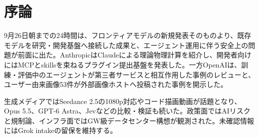 \section*{序論}
9月26日朝までの24時間は、フロンティアモデルの新規発表そのものより、既存モデルを研究・開発基盤へ接続した成果と、エージェント運用に伴う安全上の問題が前面に出た。AnthropicはClaudeによる理論物理計算を紹介し、開発者向けにはMCPとskillsを束ねるプラグイン提出基盤を発表した。一方OpenAIは、訓練・評価中のエージェントが第三者サービスと相互作用した事例のレビューと、ユーザー由来画像53件が外部画像ホストへ投稿された事例を開示した。

生成メディアではSeedance 2.5の1080p対応やコード描画動画が話題となり、Opus 5.5、GPT-6 Astra、Jevなどの比較・検証も続いた。政策面ではAIリスクと規制論、インフラ面ではGW級データセンター構想が観測された。未確認情報にはGrok intakeの留保を維持する。
